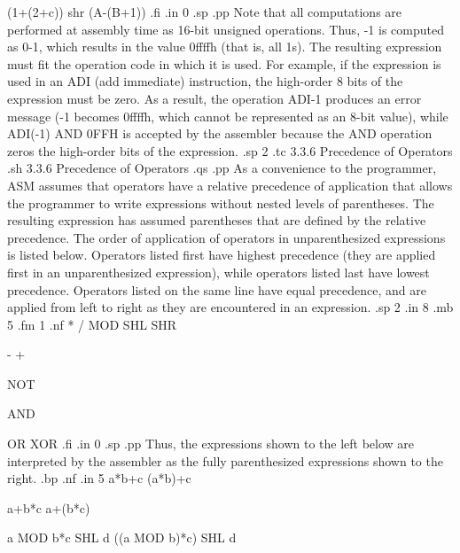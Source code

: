 (1+(2+c)) shr (A-(B+1))
.fi
.in 0
.sp
.pp
Note that all computations are performed at assembly time as 16-bit
unsigned operations.  Thus, -1 is computed as 0-1, which 
results in the value 0ffffh (that is, all 1s).  The resulting 
expression must fit the operation code in which it is used.  For 
example, if the expression is used in an ADI (add immediate)
instruction, the high-order 8 bits of the expression must be 
zero.  As a result, the operation ADI-1 produces an error message 
(-1 becomes 0ffffh, which cannot be represented as an 8-bit 
value), while ADI(-1) AND 0FFH is accepted by the assembler 
because the AND operation zeros the high-order bits of the 
expression.
.sp 2
.tc         3.3.6  Precedence of Operators
.sh
3.3.6  Precedence of Operators
.qs
.pp
As a convenience to the programmer, ASM assumes that operators 
have a relative precedence of application that allows the 
programmer to write expressions without nested levels of 
parentheses.  The resulting expression has assumed parentheses 
that are defined by the relative precedence.  The order of 
application of operators in unparenthesized expressions is listed 
below.  Operators listed first have highest precedence (they are 
applied first in an unparenthesized expression), while operators 
listed last have lowest precedence.  Operators listed on the same 
line have equal precedence, and are applied from left to right as 
they are encountered in an expression.
.sp 2
.in 8
.mb 5
.fm 1
.nf
* / MOD SHL SHR

- +

NOT

AND

OR XOR
.fi
.in 0
.sp
.pp
Thus, the expressions shown to the left below are interpreted by 
the assembler as the fully parenthesized expressions shown to the 
right.
.bp
.nf
.in 5
a*b+c                       (a*b)+c

a+b*c                       a+(b*c)

a MOD b*c SHL d             ((a MOD b)*c) SHL d

